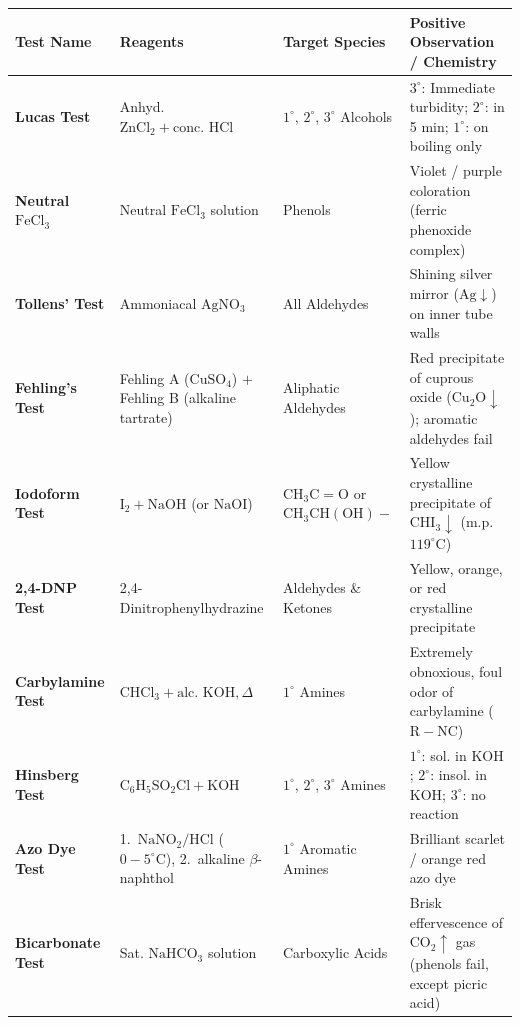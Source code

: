 \documentclass[10pt,a4paper]{article}
\begin{document}
\begin{formulabox}
\begin{tabularx}{\linewidth}{|p{2.3cm}|p{3.5cm}|p{2.6cm}|L|}
\hline
\textbf{Test Name} & \textbf{Reagents} & \textbf{Target Species} & \textbf{Positive Observation / Chemistry} \\
\hline
\textbf{Lucas Test} & Anhyd. $\mathrm{ZnCl_2} + \text{conc. } \mathrm{HCl}$ & $1^\circ$, $2^\circ$, $3^\circ$ Alcohols & $3^\circ$: Immediate turbidity; $2^\circ$: in 5 min; $1^\circ$: on boiling only \\
\hline
\textbf{Neutral $\mathrm{FeCl_3}$} & Neutral $\mathrm{FeCl_3}$ solution & Phenols & Violet / purple coloration (ferric phenoxide complex) \\
\hline
\textbf{Tollens' Test} & Ammoniacal $\mathrm{AgNO_3}$ & All Aldehydes & Shining silver mirror ($\mathrm{Ag}\downarrow$) on inner tube walls \\
\hline
\textbf{Fehling's Test} & Fehling A ($\mathrm{CuSO_4}$) $+$ Fehling B (alkaline tartrate) & Aliphatic Aldehydes & Red precipitate of cuprous oxide ($\mathrm{Cu_2O}\downarrow$); aromatic aldehydes fail \\
\hline
\textbf{Iodoform Test} & $\mathrm{I_2} + \mathrm{NaOH}$ (or $\mathrm{NaOI}$) & $\mathrm{CH_3C=O}$ or $\mathrm{CH_3CH(OH)}-$ & Yellow crystalline precipitate of $\mathrm{CHI_3}\downarrow$ (m.p. $119^\circ\text{C}$) \\
\hline
\textbf{2,4-DNP Test} & 2,4-Dinitrophenylhydrazine & Aldehydes \& Ketones & Yellow, orange, or red crystalline precipitate \\
\hline
\textbf{Carbylamine Test} & $\mathrm{CHCl_3} + \text{alc. } \mathrm{KOH}, \Delta$ & $1^\circ$ Amines & Extremely obnoxious, foul odor of carbylamine ($\mathrm{R-NC}$) \\
\hline
\textbf{Hinsberg Test} & $\mathrm{C_6H_5SO_2Cl} + \mathrm{KOH}$ & $1^\circ$, $2^\circ$, $3^\circ$ Amines & $1^\circ$: sol. in $\mathrm{KOH}$; $2^\circ$: insol. in $\mathrm{KOH}$; $3^\circ$: no reaction \\
\hline
\textbf{Azo Dye Test} & 1.~$\mathrm{NaNO_2/HCl}$ ($0-5^\circ\text{C}$), 2.~alkaline $\beta$-naphthol & $1^\circ$ Aromatic Amines & Brilliant scarlet / orange red azo dye \\
\hline
\textbf{Bicarbonate Test} & Sat. $\mathrm{NaHCO_3}$ solution & Carboxylic Acids & Brisk effervescence of $\mathrm{CO_2}\uparrow$ gas (phenols fail, except picric acid) \\
\hline
\end{tabularx}
\end{formulabox}
\end{document}
